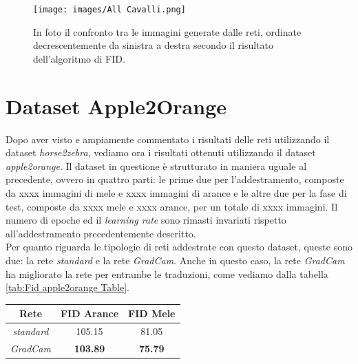 \begin{figure}[H]
\begin{center}
\texttt{[image: images/All Cavalli.png]}
\end{center}
\caption{In foto il confronto tra le immagini generate dalle reti, ordinate decrescentemente da sinistra a destra secondo il risultato dell'algoritmo di FID.}
\label{fig:Confronto tra tutte le reti cavalli}
\end{figure}  

\section{Dataset Apple2Orange}
Dopo aver visto e ampiamente commentato i risultati delle reti utilizzando il dataset \emph{horse2zebra}, vediamo ora i risultati ottenuti utilizzando il dataset \emph{apple2orange}. Il dataset in questione è strutturato in maniera uguale al precedente, ovvero in quattro parti: le prime due per l'addestramento, composte da xxxx immagini di mele e xxxx immagini di arance e le altre due per la fase di test, composte da xxxx mele e xxxx arance, per un totale di xxxx immagini. Il numero di epoche ed il \emph{learning rate} sono rimasti invariati rispetto all'addestramento precedentemente descritto.
\\Per quanto riguarda le tipologie di reti addestrate con questo dataset, queste sono due: la rete \emph{standard} e la rete \emph{GradCam}. Anche in questo caso, la rete \emph{GradCam} ha migliorato la rete per entrambe le traduzioni, come vediamo dalla tabella \ref{tab:Fid apple2orange Table}.
\begin{center}
\begin{tabular}{ | c | c | c | }
\hline
\textbf{Rete}          & \textbf{FID Arance}        &   \textbf{FID Mele}    \\
\hline
\emph{standard}          & 105.15    & 81.05  \\ \hline
\emph{GradCam}           & \textbf{103.89}     & \textbf{75.79}  \\ \hline
\end{tabular}
\label{tab:Fid apple2orange Table}
\end{center}
